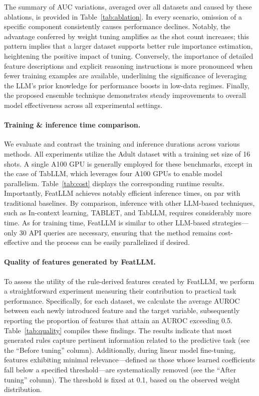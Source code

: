 The summary of AUC variations, averaged over all datasets and caused by these ablations, is provided in Table~\ref{tab:ablation}. In every scenario, omission of a specific component consistently causes performance declines. Notably, the advantage conferred by weight tuning amplifies as the shot count increases; this pattern implies that a larger dataset supports better rule importance estimation, heightening the positive impact of tuning. Conversely, the importance of detailed feature descriptions and explicit reasoning instructions is more pronounced when fewer training examples are available, underlining the significance of leveraging the LLM’s prior knowledge for performance boosts in low-data regimes. Finally, the proposed ensemble technique demonstrates steady improvements to overall model effectiveness across all experimental settings.

\vspace*{-0.12in}
\paragraph{Training \& inference time comparison.} We evaluate and contrast the training and inference durations across various methods. All experiments utilize the Adult dataset with a training set size of 16 shots. A single A100 GPU is generally employed for these benchmarks, except in the case of TabLLM, which leverages four A100 GPUs to enable model parallelism. Table~\ref{tab:cost} displays the corresponding runtime results. Importantly, \textsf{FeatLLM} achieves notably efficient inference times, on par with traditional baselines. By comparison, inference with other LLM-based techniques, such as In-context learning, TABLET, and TabLLM, requires considerably more time. As for training time, \textsf{FeatLLM} is similar to other LLM-based strategies—only 30 API queries are necessary, ensuring that the method remains cost-effective and the process can be easily parallelized if desired.

\vspace*{-0.12in}
\paragraph{Quality of features generated by \textsf{FeatLLM}.}
To assess the utility of the rule-derived features created by \textsf{FeatLLM}, we perform a straightforward experiment measuring their contribution to practical task performance. Specifically, for each dataset, we calculate the average AUROC between each newly introduced feature and the target variable, subsequently reporting the proportion of features that attain an AUROC exceeding 0.5. Table~\ref{tab:quality} compiles these findings. The results indicate that most generated rules capture pertinent information related to the predictive task (see the ``Before tuning'' column). Additionally, during linear model fine-tuning, features exhibiting minimal relevance—defined as those whose learned coefficients fall below a specified threshold—are systematically removed (see the ``After tuning'' column). The threshold is fixed at 0.1, based on the observed weight distribution.

